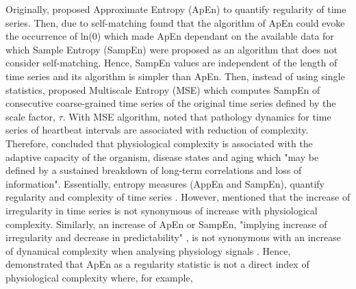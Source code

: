 Originally, \cite{pincus1991, pincus1995} proposed Approximate Entropy (ApEn) 
to quantify regularity of time series.
Then, \cite{richman2000} due to self-matching found that the algorithm 
of ApEn could evoke the occurrence of ln(0) which made ApEn dependant 
on the available 
data for which Sample Entropy (SampEn) were proposed as an algorithm that 
does not consider self-matching. 
Hence, SampEn values are independent of the length of time series and its 
algorithm is simpler than ApEn.
Then, instead of using single statistics, \cite{costa2002} proposed 
Multiscale Entropy (MSE) which computes SampEn of consecutive 
coarse-grained time series of the original time series defined by the 
scale factor, $\tau$.
With MSE algorithm, \citep{costa2002} noted that 
pathology dynamics for time series of heartbeat intervals 
are associated with reduction of complexity.
Therefore, \citealt[p. 3]{costa2002} concluded that physiological complexity 
is associated with the adaptive capacity of the organism,  
disease states and aging which "may be defined by a sustained 
 breakdown of long-term correlations and loss of information".
Essentially, entropy measures (AppEn and SampEn), 
quantify regularity and complexity of time series \citep{preatoni2013}.
However, \cite{goldberger1996} mentioned that the increase of irregularity 
in time series is not synonymous of increase with physiological complexity.
Similarly, an increase of ApEn or SampEn, "implying increase of irregularity 
and decrease in predictability" \cite[p. 25]{goldberger2002b}, is not 
synonymous with an increase of dynamical complexity when analysing physiology 
signals \citep{costa2002}.
Hence, \cite{goldberger2002b} demonstrated that ApEn as a regularity 
statistic is not a direct index of physiological complexity where, for example, 
